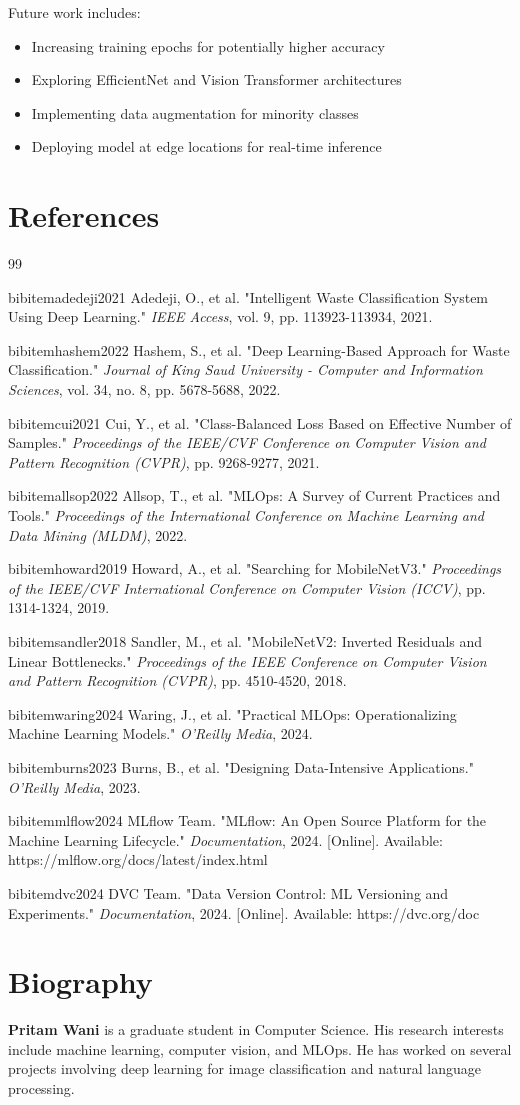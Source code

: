 \documentclass[conference]{IEEEtran}
\begin{document}
Future work includes:
\begin{itemize}
    \item Increasing training epochs for potentially higher accuracy
    \item Exploring EfficientNet and Vision Transformer architectures
    \item Implementing data augmentation for minority classes
    \item Deploying model at edge locations for real-time inference
\end{itemize}

\section{References}

\begin{thebibliography}{99}

bibitem{adedeji2021}
Adedeji, O., et al. "Intelligent Waste Classification System Using Deep Learning." \textit{IEEE Access}, vol. 9, pp. 113923-113934, 2021.

bibitem{hashem2022}
Hashem, S., et al. "Deep Learning-Based Approach for Waste Classification." \textit{Journal of King Saud University - Computer and Information Sciences}, vol. 34, no. 8, pp. 5678-5688, 2022.

bibitem{cui2021}
Cui, Y., et al. "Class-Balanced Loss Based on Effective Number of Samples." \textit{Proceedings of the IEEE/CVF Conference on Computer Vision and Pattern Recognition (CVPR)}, pp. 9268-9277, 2021.

bibitem{allsop2022}
Allsop, T., et al. "MLOps: A Survey of Current Practices and Tools." \textit{Proceedings of the International Conference on Machine Learning and Data Mining (MLDM)}, 2022.

bibitem{howard2019}
Howard, A., et al. "Searching for MobileNetV3." \textit{Proceedings of the IEEE/CVF International Conference on Computer Vision (ICCV)}, pp. 1314-1324, 2019.

bibitem{sandler2018}
Sandler, M., et al. "MobileNetV2: Inverted Residuals and Linear Bottlenecks." \textit{Proceedings of the IEEE Conference on Computer Vision and Pattern Recognition (CVPR)}, pp. 4510-4520, 2018.

bibitem{waring2024}
Waring, J., et al. "Practical MLOps: Operationalizing Machine Learning Models." \textit{O'Reilly Media}, 2024.

bibitem{burns2023}
Burns, B., et al. "Designing Data-Intensive Applications." \textit{O'Reilly Media}, 2023.

bibitem{mlflow2024}
MLflow Team. "MLflow: An Open Source Platform for the Machine Learning Lifecycle." \textit{Documentation}, 2024. [Online]. Available: https://mlflow.org/docs/latest/index.html

bibitem{dvc2024}
DVC Team. "Data Version Control: ML Versioning and Experiments." \textit{Documentation}, 2024. [Online]. Available: https://dvc.org/doc

\end{thebibliography}

\section*{Biography}
\textbf{Pritam Wani} is a graduate student in Computer Science. His research interests include machine learning, computer vision, and MLOps. He has worked on several projects involving deep learning for image classification and natural language processing.
\end{document}
